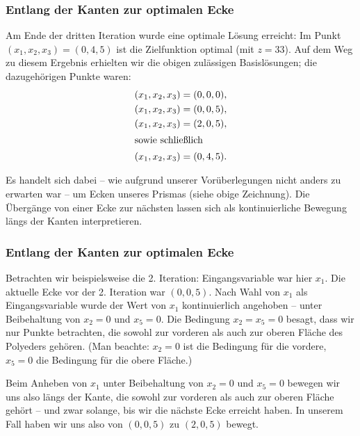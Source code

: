 \documentclass[smaller]{beamer}
\begin{document}
\begin{frame}
 \frametitle{Entlang der Kanten zur optimalen Ecke}
 Am Ende der dritten Iteration wurde eine optimale Lösung erreicht: Im Punkt $(x_1,x_2,x_3) = (0,4,5)$ ist die Zielfunktion optimal (mit $z=33$). Auf dem Weg zu diesem Ergebnis erhielten wir die obigen zulässigen Basislösungen; die dazugehörigen Punkte waren:
\begin{align*}
(x_1,x_2,x_3) &= (0,0,0), \\
(x_1,x_2,x_3) &= (0,0,5), \\
(x_1,x_2,x_3) &= (2,0,5), \\
\intertext{sowie schließlich}
(x_1,x_2,x_3) &= (0,4,5). \\
\end{align*}

Es handelt sich dabei -- wie aufgrund unserer Vorüberlegungen nicht anders zu erwarten war -- um \alert{Ecken unseres Prismas} (siehe obige Zeichnung). \alert{Die Übergänge von einer Ecke zur nächsten lassen sich als kontinuierliche Bewegung längs der Kanten interpretieren}.
\end{frame}

\begin{frame}
 \frametitle{Entlang der Kanten zur optimalen Ecke}
 Betrachten wir beispielsweise die 2. Iteration: Eingangsvariable war hier $x_1$. Die aktuelle Ecke vor der 2. Iteration war $(0,0,5)$. Nach Wahl von $x_1$ als Eingangsvariable wurde der Wert von $x_1$ kontinuierlich angehoben -- unter Beibehaltung von $x_2=0$ und $x_5=0$. Die Bedingung $x_2=x_5=0$ besagt, dass wir nur Punkte betrachten, die sowohl zur vorderen als auch zur oberen Fläche des Polyeders gehören. (Man beachte: $x_2=0$ ist die Bedingung für die vordere, $x_5=0$ die Bedingung für die obere Fläche.) \\ \vspace*{0.2cm}

Beim Anheben von $x_1$ unter Beibehaltung von $x_2=0$ und $x_5=0$ bewegen wir uns also längs der Kante, die sowohl zur vorderen als auch zur oberen Fläche gehört -- und zwar solange, bis wir die nächste Ecke erreicht haben. \alert{In unserem Fall haben wir uns also von $(0,0,5)$ zu $(2,0,5)$ bewegt}.
\end{frame}
\end{document}
